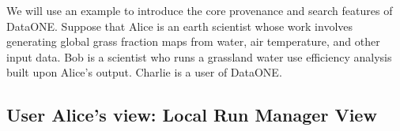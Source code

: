 \documentclass[a4paper]{llncs}
\newcommand{\mytt}[1]{\ensuremath{\mathtt{#1}}}
\begin{document}
We will use an example to introduce the core provenance and search features of DataONE. Suppose that Alice is an earth scientist whose work involves generating global grass fraction maps from water, air temperature, and other input data. Bob is a scientist who runs a grassland water use efficiency analysis built upon Alice's output. Charlie is a user of DataONE.

\subsection{User Alice's view: Local Run Manager View}


\end{document}

